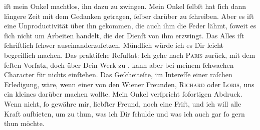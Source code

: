                iſt mein Onkel machtlos, ihn
               dazu zu zwingen. Mein Onkel
               ſelbſt hat ſich dann längere Zeit mit dem Gedanken getragen, ſelber darüber zu
               ſchreiben. Aber es iſt eine Unproductivität über ihn gekommen, die auch ihm die Feder
               lähmt, ſoweit es ſich nicht um Arbeiten handelt, die der Dienſt von ihm erzwingt. Das
               Alles iſt {\pb} ſchriftlich ſchwer auseinanderzuſetzen.
               Mündlich würde ich es Dir leicht begreiflich machen. Das praktiſche Reſultat: Ich
               gehe nach \textsc{Paris} zurück, mit dem feſten Vorſatz, doch über Dein Werk zu \label{K_L02709-6v}\label{K_L02709-6}, kann aber bei meinem ſchwachen Character für nichts
               einſtehen. Das Geſcheiteſte, im Intereſſe einer raſchen Erledigung, wäre, wenn einer
               von den Wiener Freunden, \textsc{Richard} oder \textsc{Loris}, uns ein kleines \introOben{}\label{K_L02709-7v}\label{K_L02709-7}\introOben{}{ }\strikeout{\textcolor{gray}{×}\-\textcolor{gray}{×}\-\textcolor{gray}{×}\-\textcolor{gray}{×}\-\textcolor{gray}{×}\-\textcolor{gray}{×}} darüber machen wollte. Mein Onkel verſpricht {\pb}ſofortigen Abdruck. Wenn
               nicht, ſo gewähre mir, liebſter Freund, noch eine Friſt, und ich will alle Kraft
               aufbieten, um zu thun, was ich Dir ſchulde und was ich auch gar ſo gern thun
               möchte.\pend
           
